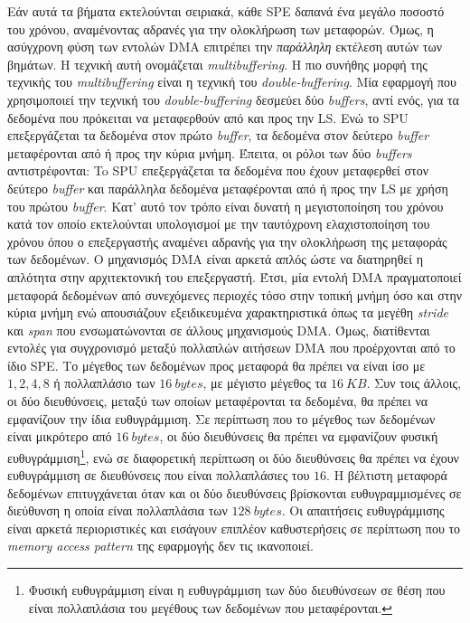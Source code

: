 \indent Εάν αυτά τα βήματα εκτελούνται σειριακά, κάθε \ac{SPE} δαπανά ένα μεγάλο ποσοστό του χρόνου, αναμένοντας αδρανές για την ολοκλήρωση των μεταφορών. Όμως, η ασύγχρονη φύση των εντολών \ac{DMA} επιτρέπει την \textsl{παράλληλη} εκτέλεση αυτών των βημάτων. Η τεχνική αυτή ονομάζεται \textsl{multibuffering}. Η πιο συνήθης μορφή της τεχνικής του \textsl{multibuffering} είναι η τεχνική του \textsl{double-buffering}. Μία εφαρμογή που χρησιμοποιεί την τεχνική του \textsl{double-buffering} δεσμεύει δύο \textsl{buffers}, αντί ενός, για τα δεδομένα που πρόκειται να μεταφερθούν από και προς την \ac{LS}. Ενώ το \ac{SPU} επεξεργάζεται τα δεδομένα στον πρώτο \textsl{buffer}, τα δεδομένα στον δεύτερο \textsl{buffer} μεταφέρονται από ή προς την κύρια μνήμη. Έπειτα, οι ρόλοι των δύο \textsl{buffers} αντιστρέφονται: To \ac{SPU} επεξεργάζεται τα δεδομένα που έχουν μεταφερθεί στον δεύτερο \textsl{buffer} και παράλληλα δεδομένα μεταφέρονται από ή προς την \ac{LS} με χρήση του πρώτου \textsl{buffer}. Κατ' αυτό τον τρόπο είναι δυνατή η μεγιστοποίηση του χρόνου κατά τον οποίο εκτελούνται υπολογισμοί με την ταυτόχρονη ελαχιστοποίηση του χρόνου όπου ο επεξεργαστής αναμένει αδρανής για την ολοκλήρωση της μεταφοράς των δεδομένων. \newline \indent
Ο μηχανισμός \ac{DMA} είναι αρκετά απλός ώστε να διατηρηθεί η απλότητα στην αρχιτεκτονική του επεξεργαστή. Έτσι, μία εντολή \ac{DMA} πραγματοποιεί μεταφορά δεδομένων από συνεχόμενες περιοχές τόσο στην τοπική μνήμη όσο και στην κύρια μνήμη ενώ απουσιάζουν εξειδικευμένα χαρακτηριστικά όπως τα μεγέθη \textsl{stride} και \textsl{span} που ενσωματώνονται σε άλλους μηχανισμούς \ac{DMA}. Όμως, διατίθενται εντολές για συγχρονισμό μεταξύ πολλαπλών αιτήσεων \ac{DMA} που προέρχονται από το ίδιο \ac{SPE}.\newline \indent
Το μέγεθος των δεδομένων προς μεταφορά θα πρέπει να είναι ίσο με \(1, 2, 4, 8\) ή πολλαπλάσιο των \(16\ bytes\), με μέγιστο μέγεθος τα \(16\ KB\). Συν τοις άλλοις, οι δύο διευθύνσεις, μεταξύ των οποίων μεταφέρονται τα δεδομένα, θα πρέπει να εμφανίζουν την ίδια ευθυγράμμιση. Σε περίπτωση που το μέγεθος των δεδομένων είναι μικρότερο από \(16\ bytes\), οι δύο διευθύνσεις θα πρέπει να εμφανίζουν φυσική ευθυγράμμιση\footnote{\small Φυσική ευθυγράμμιση είναι η ευθυγράμμιση των δύο διευθύνσεων σε θέση που είναι πολλαπλάσια του μεγέθους των δεδομένων που μεταφέρονται.}, ενώ σε διαφορετική περίπτωση οι δύο διευθύνσεις θα πρέπει να έχουν ευθυγράμμιση σε διευθύνσεις που είναι πολλαπλάσιες του \(16\). Η βέλτιστη μεταφορά δεδομένων επιτυγχάνεται όταν και οι δύο διευθύνσεις βρίσκονται ευθυγραμμισμένες σε διεύθυνση η οποία είναι πολλαπλάσια των \(128\ bytes\). Οι απαιτήσεις ευθυγράμμισης είναι αρκετά περιοριστικές και εισάγουν επιπλέον καθυστερήσεις σε περίπτωση που το \textsl{memory access pattern} της εφαρμογής δεν τις ικανοποιεί.\newline \indent
